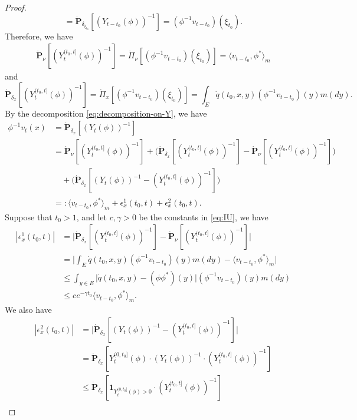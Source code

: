 \documentclass[UTF8]{pkuthss}
\theoremstyle{plain}
\theoremstyle{definition}
\numberwithin{equation}{section}
\begin{document}
\begin{proof}
\[	= \dot{\mathbf P}_{\delta_{\xi_{t_0}}}[(Y_{t-t_0}(\phi))^{-1}]
	= (\phi^{-1}v_{t-t_0})(\xi_{t_0}).
\]
	Therefore, we have
\begin{align}
	\dot{\mathbf P}_\nu[(Y_t^{(t_0,t]}(\phi))^{-1}]
	= \dot{\Pi}_{\nu}[(\phi^{-1}v_{t-t_0})(\xi_{t_0}) ]
	= \langle v_{t-t_0},\phi^* \rangle_m
\end{align}
	and
\begin{equation}
\label{eq:Yt0t}
	\dot{\mathbf P}_{\delta_x}[(Y_t^{(t_0,t]}(\phi))^{-1}]
	= \dot{\Pi}_x[(\phi^{-1}v_{t-t_0})(\xi_{t_0}) ]
	=  \int_E  \dot{q}(t_0,x,y)(\phi^{-1}v_{t-t_0})(y) m(dy).
\end{equation}
	By the decomposition \eqref{eq:decomposition-on-Y}, we have
\begin{align}\label{eq:vt-equation}
	\phi^{-1}v_t(x)
	&= \dot {\mathbf P}_{\delta_x} [(Y_t(\phi))^{-1}]\\
	&= \dot {\mathbf P}_\nu [(Y^{(t_0,t]}_t(\phi))^{-1}] + \big( \dot {\mathbf P}_{\delta_x} [(Y^{(t_0,t]}_t(\phi))^{-1}] - \dot {\mathbf P}_\nu [(Y^{(t_0,t]}_t(\phi))^{-1}] \big) \\
	&\quad + \big( \dot{\mathbf P}_{\delta_x}[(Y_t(\phi))^{-1} - (Y^{(t_0,t]}_t(\phi))^{-1}] \big)\\
	&=: \langle v_{t-t_0},\phi^* \rangle_m + \epsilon_x^1(t_0,t) +\epsilon_x^2(t_0,t).
\end{align}
	Suppose that $t_0 >1$, and let $c,\gamma > 0$ be the constants in \eqref{eq:IU}, we have
\begin{align}\label{eq:epsilon-1}
	|\epsilon_x^1(t_0,t)|
	& = \big| \dot {\mathbf P}_{\delta_x} [(Y^{(t_0,t]}_t(\phi))^{-1}] - \dot {\mathbf P}_\nu [(Y^{(t_0,t]}_t(\phi))^{-1}] \big| \\
	& = \big|  \int_E  \dot{q}(t_0,x,y)(\phi^{-1}v_{t-t_0})(y) m(dy) - \langle v_{t-t_0},\phi^* \rangle_m \big|\\
	& \leq \int_{y\in E} \big| \dot{q}(t_0,x,y) - (\phi\phi^*)(y) \big| (\phi^{-1}v_{t-t_0})(y) m(dy)\\
	& \leq ce^{-\gamma t_0}\langle v_{t-t_0},\phi^* \rangle_m .
\end{align}
	We also have
\begin{align}\label{eq:epsilon-2}
	|\epsilon_x^2(t_0,t)|
	&= \big| \dot{\mathbf P}_{\delta_x}[(Y_t(\phi))^{-1} - (Y^{(t_0,t]}_t(\phi))^{-1}] \big| \\
	&= \dot{\mathbf P}_{\delta_x}[Y_t^{(0,t_0]}(\phi)\cdot (Y_t(\phi))^{-1}\cdot (Y^{(t_0,t]}_t(\phi))^{-1}]\\
	&\leq \dot{\mathbf P}_{\delta_x}[\mathbf 1_{Y_t^{(0,t_0]}(\phi)>0}\cdot (Y^{(t_0,t]}_t(\phi))^{-1}]\\

\end{align}
\end{proof}
\end{document}
